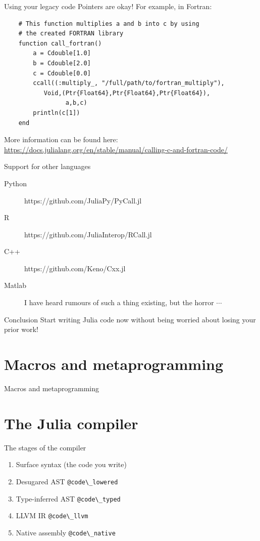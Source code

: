 \documentclass{beamer}
\begin{document}
\begin{frame}[fragile]{Using your legacy code}
Pointers are okay! For example, in Fortran:

\begin{lstlisting}
    # This function multiplies a and b into c by using 
    # the created FORTRAN library
    function call_fortran()
        a = Cdouble[1.0]
        b = Cdouble[2.0]
        c = Cdouble[0.0]
        ccall((:multiply_, "/full/path/to/fortran_multiply"),
           Void,(Ptr{Float64},Ptr{Float64},Ptr{Float64}),
                 a,b,c)
        println(c[1])
    end
\end{lstlisting}

\pause
More information can be found here: \url{https://docs.julialang.org/en/stable/manual/calling-c-and-fortran-code/}
\end{frame}
\begin{frame}{Support for other languages}
  \begin{description}
    \item[Python] https://github.com/JuliaPy/PyCall.jl
    \item[R] https://github.com/JuliaInterop/RCall.jl
    \item[C++] https://github.com/Keno/Cxx.jl
    \item[Matlab] I have heard rumours of such a thing existing, but the horror $\cdots$
  \end{description}
  \begin{block}{Conclusion}
    Start writing Julia code now without being worried about losing your prior work!
  \end{block}
\end{frame}

\section{Macros and metaprogramming}
\begin{frame}{Macros and metaprogramming}
\end{frame}
\section{The Julia compiler}
\begin{frame}[fragile]{The stages of the compiler}
  \begin{enumerate}
    \item Surface syntax (the code you write)
    \item Desugared AST \lstinline{@code\_lowered}
    \item Type-inferred AST \lstinline{@code\_typed}
    \item LLVM IR \lstinline{@code\_llvm}
    \item Native assembly \lstinline{@code\_native}
  \end{enumerate}
\end{frame}
\end{document}
